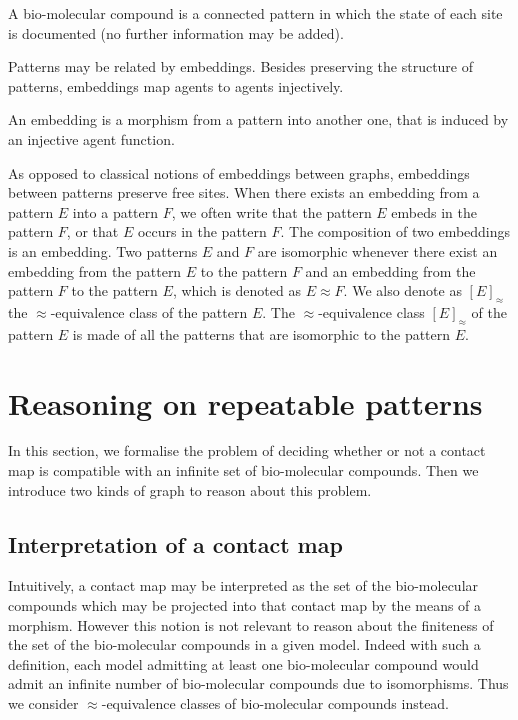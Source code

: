 \documentclass{entcs}
\newcommand{\iso}{\approx}
\begin{document}
A bio-molecular compound is a connected pattern in which the state of each site is documented (no further information may be added).

Patterns may be related by embeddings. Besides preserving the structure of patterns, embeddings map agents to agents injectively.

\begin{defn}[embeddings]
  An embedding is a morphism from a pattern into another one, that is induced by an injective agent function.
\end{defn}

As opposed to classical notions of embeddings between graphs, embeddings between patterns preserve free sites.
When there exists an embedding from a pattern $E$ into a pattern $F$, we often write that the pattern $E$ embeds in the pattern $F$, or that $E$ occurs in the pattern $F$. The composition of two embeddings is an embedding. Two patterns $E$ and $F$ are isomorphic whenever there exist an embedding from the pattern $E$ to the pattern $F$ and an embedding from the pattern $F$ to the pattern $E$, which is denoted as $E \iso F$.  We also denote as $[E]_{\iso}$ the $\iso$-equivalence class of the pattern $E$. The $\iso$-equivalence class $[E]_{\iso}$ of the pattern $E$ is made of all the patterns that are isomorphic to the pattern $E$.

\section{Reasoning on repeatable patterns}
\label{sec:graphs}

In this section, we formalise the problem of deciding whether or not a contact map is compatible with an infinite set of bio-molecular compounds. Then we introduce two kinds of graph to reason about this problem.

\subsection{Interpretation of a contact map}

Intuitively, a contact map may be interpreted as the set of the bio-molecular compounds which may be projected into that contact map by the means of a morphism. However this notion is not relevant to reason about the finiteness of the set of the bio-molecular compounds in  a given model. Indeed with such a  definition,  each model admitting at least one bio-molecular compound would admit an infinite number of bio-molecular compounds due to isomorphisms. Thus we consider $\iso$-equivalence classes of bio-molecular compounds instead.
\end{document}
